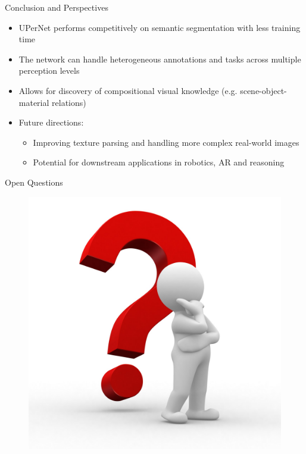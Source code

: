 \documentclass{beamer}
\begin{document}
\begin{frame}{Conclusion and Perspectives}
  \begin{itemize}
    \item UPerNet performs competitively on semantic segmentation with less training time
    \item The network can handle heterogeneous annotations and tasks across multiple perception levels
    \item Allows for discovery of compositional visual knowledge (e.g. scene-object-material relations)
    \item Future directions:
    \begin{itemize}
      \item Improving texture parsing and handling more complex real-world images
      \item Potential for downstream applications in robotics, AR and reasoning
    \end{itemize}
  \end{itemize}
\end{frame}

\begin{frame}{Open Questions}
\begin{figure}
    \centering
    \includegraphics[height=0.8\textheight]{Images/Questions.jpg}
\end{figure}
\end{frame}
\end{document}
